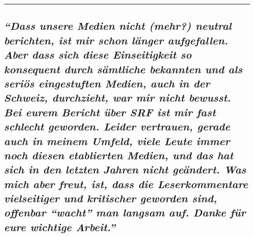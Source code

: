 \begin{center}\rule{0.5\linewidth}{\linethickness}\end{center}

\hypertarget{dass-unsere-medien-nicht-mehr-neutral-berichten-ist-mir-schon-luxe4nger-aufgefallen-aber-dass-sich-diese-einseitigkeit-so-konsequent-durch-suxe4mtliche-bekannten-und-als-seriuxf6s-eingestuften-medien-auch-in-der-schweiz-durchzieht-war-mir-nicht-bewusst-bei-eurem-bericht-uxfcber-srf-ist-mir-fast-schlecht-geworden-leider-vertrauen-gerade-auch-in-meinem-umfeld-viele-leute-immer-noch-diesen-etablierten-medien-und-das-hat-sich-in-den-letzten-jahren-nicht-geuxe4ndert-was-mich-aber-freut-ist-dass-die-leserkommentare-vielseitiger-und-kritischer-geworden-sind-offenbar-wacht-man-langsam-auf-danke-fuxfcr-eure-wichtige-arbeit}{%
\subsection{\texorpdfstring{\emph{``Dass unsere Medien nicht (mehr?)
neutral berichten, ist mir schon länger aufgefallen. Aber dass sich
diese Einseitigkeit so konsequent durch sämtliche bekannten und als
seriös eingestuften Medien, auch in der Schweiz, durchzieht, war mir
nicht bewusst. Bei eurem Bericht über SRF ist mir fast schlecht
geworden. Leider vertrauen, gerade auch in meinem Umfeld, viele Leute
immer noch diesen etablierten Medien, und das hat sich in den letzten
Jahren nicht geändert. Was mich aber freut, ist, dass die
Leser­kommentare vielseitiger und kritischer geworden sind, offenbar
``wacht'' man langsam auf. Danke für eure wichtige
Arbeit.''}}{``Dass unsere Medien nicht (mehr?) neutral berichten, ist mir schon länger aufgefallen. Aber dass sich diese Einseitigkeit so konsequent durch sämtliche bekannten und als seriös eingestuften Medien, auch in der Schweiz, durchzieht, war mir nicht bewusst. Bei eurem Bericht über SRF ist mir fast schlecht geworden. Leider vertrauen, gerade auch in meinem Umfeld, viele Leute immer noch diesen etablierten Medien, und das hat sich in den letzten Jahren nicht geändert. Was mich aber freut, ist, dass die Leser­kommentare vielseitiger und kritischer geworden sind, offenbar ``wacht'' man langsam auf. Danke für eure wichtige Arbeit.''}}\label{dass-unsere-medien-nicht-mehr-neutral-berichten-ist-mir-schon-luxe4nger-aufgefallen-aber-dass-sich-diese-einseitigkeit-so-konsequent-durch-suxe4mtliche-bekannten-und-als-seriuxf6s-eingestuften-medien-auch-in-der-schweiz-durchzieht-war-mir-nicht-bewusst-bei-eurem-bericht-uxfcber-srf-ist-mir-fast-schlecht-geworden-leider-vertrauen-gerade-auch-in-meinem-umfeld-viele-leute-immer-noch-diesen-etablierten-medien-und-das-hat-sich-in-den-letzten-jahren-nicht-geuxe4ndert-was-mich-aber-freut-ist-dass-die-leserkommentare-vielseitiger-und-kritischer-geworden-sind-offenbar-wacht-man-langsam-auf-danke-fuxfcr-eure-wichtige-arbeit}}

